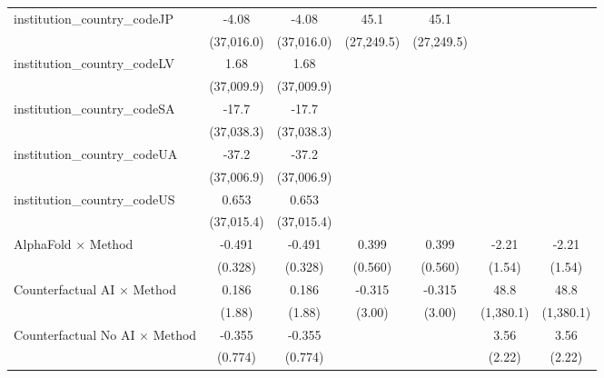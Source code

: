 \begin{tabular}{lcccccc}
   institution\_country\_codeJP          & -4.08        & -4.08        & 45.1         & 45.1         &            &   \\   
                                         & (37,016.0)   & (37,016.0)   & (27,249.5)   & (27,249.5)   &            &   \\   
   institution\_country\_codeLV          & 1.68         & 1.68         &              &              &            &   \\   
                                         & (37,009.9)   & (37,009.9)   &              &              &            &   \\   
   institution\_country\_codeSA          & -17.7        & -17.7        &              &              &            &   \\   
                                         & (37,038.3)   & (37,038.3)   &              &              &            &   \\   
   institution\_country\_codeUA          & -37.2        & -37.2        &              &              &            &   \\   
                                         & (37,006.9)   & (37,006.9)   &              &              &            &   \\   
   institution\_country\_codeUS          & 0.653        & 0.653        &              &              &            &   \\   
                                         & (37,015.4)   & (37,015.4)   &              &              &            &   \\   
   AlphaFold $\times$ Method             & -0.491       & -0.491       & 0.399        & 0.399        & -2.21      & -2.21\\   
                                         & (0.328)      & (0.328)      & (0.560)      & (0.560)      & (1.54)     & (1.54)\\   
   Counterfactual AI $\times$ Method     & 0.186        & 0.186        & -0.315       & -0.315       & 48.8       & 48.8\\   
                                         & (1.88)       & (1.88)       & (3.00)       & (3.00)       & (1,380.1)  & (1,380.1)\\   
   Counterfactual No AI $\times$ Method  & -0.355       & -0.355       &              &              & 3.56       & 3.56\\   
                                         & (0.774)      & (0.774)      &              &              & (2.22)     & (2.22)\\   

\end{tabular}
